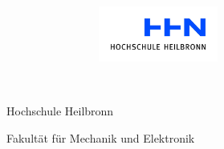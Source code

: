\thispagestyle{empty}

\begin{titlepage}


\begin{figure}[t]
 \centering
 \hspace{7cm}
~~~~~~~~~~
 \includegraphics[width=0.35\textwidth]{img/HHN_Logo.jpg}
\end{figure}


\begin{verbatim}


\end{verbatim}

\begin{center}
\Large{Hochschule Heilbronn}\\
\end{center}


\begin{center}
\Large{Fakultät für Mechanik und Elektronik}
\end{center}
\begin{verbatim}




\end{verbatim}
\begin{center}
\doublespacing
\textbf{\LARGE{\titleDocument}}\\
\singlespacing
\begin{verbatim}

\end{verbatim}
\textbf{\subjectDocument}
\end{center}
\begin{verbatim}

\end{verbatim}
\begin{center}

\end{center}
\begin{verbatim}

\end{verbatim}
\begin{verbatim}







\end{verbatim}
\end{titlepage}
